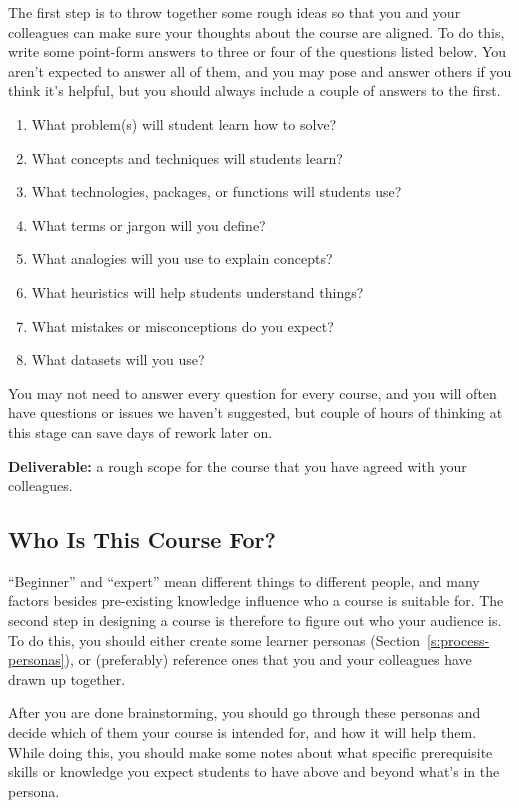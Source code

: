 The first step is to throw together some rough ideas so that you and
your colleagues can make sure your thoughts about the course are
aligned. To do this, write some point-form answers to three or four of
the questions listed below. You aren't expected to answer all of them,
and you may pose and answer others if you think it's helpful, but you
should always include a couple of answers to the first.

\begin{enumerate}
\item
  What problem(s) will student learn how to solve?
\item
  What concepts and techniques will students learn?
\item
  What technologies, packages, or functions will students use?
\item
  What terms or jargon will you define?
\item
  What analogies will you use to explain concepts?
\item
  What heuristics will help students understand things?
\item
  What mistakes or misconceptions do you expect?
\item
  What datasets will you use?
\end{enumerate}

You may not need to answer every question for every course, and you will
often have questions or issues we haven't suggested, but couple of hours
of thinking at this stage can save days of rework later on.

\textbf{Deliverable:} a rough scope for the course that you have agreed with
your colleagues.

\subsection{Who Is This Course For?}

``Beginner'' and ``expert'' mean different things to different people, and
many factors besides pre-existing knowledge influence who a course is
suitable for. The second step in designing a course is therefore to
figure out who your audience is. To do this, you should either create
some learner personas (Section~\ref{s:process-personas}), or (preferably)
reference ones that you and your colleagues have drawn up together.

After you are done brainstorming, you should go through these personas
and decide which of them your course is intended for, and how it will
help them. While doing this, you should make some notes about what
specific prerequisite skills or knowledge you expect students to have
above and beyond what's in the persona.

